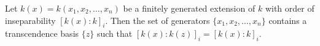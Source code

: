 Let $k(x) = k(x_1, x_2, \dots, x_n)$ be a finitely generated extension of $k$ with order of inseparability $[k(x):k]_i$. Then the set of generators $\{x_1, x_2, \dots, x_n\}$ contains a transcendence basis $\{z\}$ such that $[k(x):k(z)]_i = [k(x):k]_i$.
